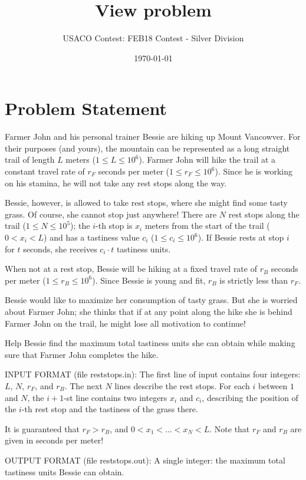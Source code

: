 \documentclass[12pt]{article}
\title{View problem}
\author{USACO Contest: FEB18 Contest - Silver Division}
\date{\today}
\begin{document}
\maketitle

\section*{Problem Statement}

Farmer John and his personal trainer Bessie are hiking up Mount Vancowver. For
their purposes (and yours), the mountain can be represented as a long straight
trail of length $L$ meters ($1 \leq L \leq 10^6$). Farmer John will hike the
trail at a constant travel rate of $r_F$ seconds per meter
($1 \leq r_F \leq 10^6$). Since he is working on his stamina, he will not take
any rest stops along the way.

Bessie, however, is allowed to take rest stops, where she might find some tasty
grass. Of course, she cannot stop just anywhere! There are $N$ rest stops along
the trail ($1 \leq N \leq 10^5$); the $i$-th stop is $x_i$ meters from the start
of the trail ($0 < x_i < L$) and has a tastiness value $c_i$
($1 \leq c_i \leq 10^6$). If Bessie rests at stop $i$ for $t$ seconds, she
receives $c_i \cdot t$ tastiness units.

When not at a rest stop, Bessie will be hiking at a fixed travel rate of $r_B$
seconds per meter ($1 \leq r_B \leq 10^6$). Since Bessie is young and fit, $r_B$
is strictly less than $r_F$.

Bessie would like to maximize her consumption of tasty grass. But she is worried
about Farmer John; she thinks that if at any point along the hike she is behind
Farmer John on the trail, he might lose all motivation to continue!

Help Bessie find the maximum total tastiness units she can obtain while making
sure that Farmer John completes the hike.

INPUT FORMAT (file reststops.in):
The first line of input contains four integers: $L$, $N$, $r_F$, and $r_B$. The
next $N$ lines describe the rest stops. For each $i$ between $1$ and $N$, the
$i+1$-st line contains two integers $x_i$ and $c_i$, describing the position of
the $i$-th rest stop and the tastiness of the grass there.

It is guaranteed that $r_F > r_B$, and $0 < x_1 < \dots < x_N < L $.  Note
that $r_F$ and $r_B$ are given in seconds per meter! 

OUTPUT FORMAT (file reststops.out):
A single integer: the maximum total tastiness units Bessie can obtain.
\end{document}
